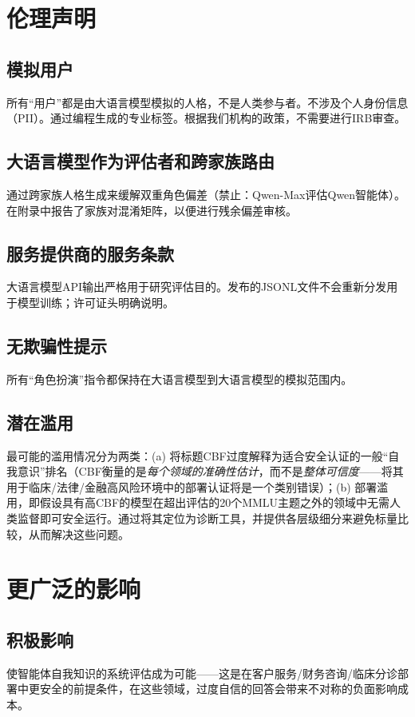 \documentclass[11pt,a4paper,fontset=fandol]{ctexart}
\begin{document}
\section*{伦理声明}

\subsection*{模拟用户}
所有“用户”都是由大语言模型模拟的人格，不是人类参与者。不涉及个人身份信息（PII）。通过编程生成的专业标签。根据我们机构的政策，不需要进行IRB审查。

\subsection*{大语言模型作为评估者和跨家族路由}
通过跨家族人格生成来缓解双重角色偏差（禁止：Qwen-Max评估Qwen智能体）。在附录中报告了家族对混淆矩阵，以便进行残余偏差审核。

\subsection*{服务提供商的服务条款}
大语言模型API输出严格用于研究评估目的。发布的JSONL文件不会重新分发用于模型训练；许可证头明确说明。

\subsection*{无欺骗性提示}
所有“角色扮演”指令都保持在大语言模型到大语言模型的模拟范围内。

\subsection*{潜在滥用}
最可能的滥用情况分为两类：(a) 将标题CBF过度解释为适合安全认证的一般“自我意识”排名（CBF衡量的是\emph{每个领域的准确性估计}，而不是\emph{整体可信度}——将其用于临床/法律/金融高风险环境中的部署认证将是一个类别错误）；(b) 部署滥用，即假设具有高CBF的模型在超出评估的20个MMLU主题之外的领域中无需人类监督即可安全运行。通过将其定位为诊断工具，并提供各层级细分来避免标量比较，从而解决这些问题。

\section*{更广泛的影响}

\subsection*{积极影响}
使智能体自我知识的系统评估成为可能——这是在客户服务/财务咨询/临床分诊部署中更安全的前提条件，在这些领域，过度自信的回答会带来不对称的负面影响成本。
\end{document}
